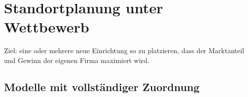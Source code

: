     


  \section{Standortplanung unter Wettbewerb} %
  \label{sec:standortplanung_unter_wettbewerb}

    \par Ziel: eine oder mehrere neue Einrichtung so zu platzieren, dass der Marktanteil und Gewinn der eigenen Firma maximiert wird.

    \subsection{Modelle mit vollständiger Zuordnung} %
    \label{sub:modelle_mit_vollst_ndiger_zuordnung}

